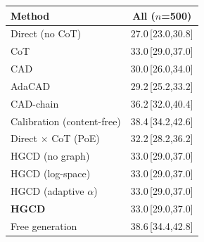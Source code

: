 \begin{tabular}{lc}
\toprule
Method & All ($n$=500) \\
\midrule
Direct (no CoT) & 27.0\,{\scriptsize[23.0,30.8]} \\
CoT & 33.0\,{\scriptsize[29.0,37.0]} \\
CAD & 30.0\,{\scriptsize[26.0,34.0]} \\
AdaCAD & 29.2\,{\scriptsize[25.2,33.2]} \\
CAD-chain & 36.2\,{\scriptsize[32.0,40.4]} \\
Calibration (content-free) & 38.4\,{\scriptsize[34.2,42.6]} \\
Direct $\times$ CoT (PoE) & 32.2\,{\scriptsize[28.2,36.2]} \\
HGCD (no graph) & 33.0\,{\scriptsize[29.0,37.0]} \\
HGCD (log-space) & 33.0\,{\scriptsize[29.0,37.0]} \\
HGCD (adaptive $\alpha$) & 33.0\,{\scriptsize[29.0,37.0]} \\
\textbf{HGCD} & 33.0\,{\scriptsize[29.0,37.0]} \\
Free generation & 38.6\,{\scriptsize[34.4,42.8]} \\
\bottomrule
\end{tabular}
